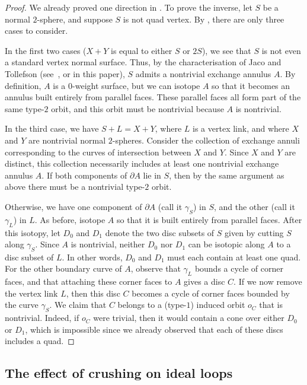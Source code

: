 \documentclass[a4paper,UKenglish,cleveref, autoref, thm-restate]{lipics-v2021}
\begin{document}
\begin{proof}
We already proved one direction in .
To prove the inverse, let $S$ be a normal $2$-sphere, and suppose $S$ is not quad vertex.
By , there are only three cases to consider.

In the first two cases ($X+Y$ is equal to either $S$ or $2S$), we see that $S$ is not even a standard vertex normal surface.
Thus, by the characterisation of Jaco and Tollefson (see~\cite[Theorem~4.1]{jaco1995algorithms}, or
 in this paper), $S$ admits a nontrivial exchange annulus $A$.
By definition, $A$ is a $0$-weight surface, but we can isotope $A$ so that it becomes an annulus built entirely from parallel faces.
These parallel faces all form part of the same type-$2$ orbit, and this orbit must be nontrivial because $A$ is nontrivial.

In the third case, we have $S+L = X+Y$, where $L$ is a vertex link, and where $X$ and $Y$ are nontrivial normal $2$-spheres.
Consider the collection of exchange annuli corresponding to the curves of intersection between $X$ and $Y$.
Since $X$ and $Y$ are distinct, this collection necessarily includes at least one nontrivial exchange annulus $A$.
If both components of $\partial A$ lie in $S$, then by the same argument as above there must be a nontrivial type-$2$ orbit.

Otherwise, we have one component of $\partial A$ (call it $\gamma_S$) in $S$, and the other (call it $\gamma_L$) in $L$.
As before, isotope $A$ so that it is built entirely from parallel faces.
After this isotopy, let $D_0$ and $D_1$ denote the two disc subsets of $S$ given by cutting $S$ along $\gamma_S$.
Since $A$ is nontrivial, neither $D_0$ nor $D_1$ can be isotopic along $A$ to a disc subset of $L$.
In other words, $D_0$ and $D_1$ must each contain at least one quad.
For the other boundary curve of $A$, observe that $\gamma_L$ bounds a cycle of corner faces, and that attaching these corner faces to $A$ gives a disc $C$.
If we now remove the vertex link $L$, then this disc $C$ becomes a cycle of corner faces bounded by the curve $\gamma_S$.
We claim that $C$ belongs to a (type-$1$) induced orbit $o_C$ that is nontrivial.
Indeed, if $o_C$ were trivial, then it would contain a cone over either $D_0$ or $D_1$, which is impossible since we already observed that each of these discs includes a quad.
\end{proof}

\subsection{The effect of crushing on ideal loops}\label{ssec:crushIdealLoop}
\end{document}
